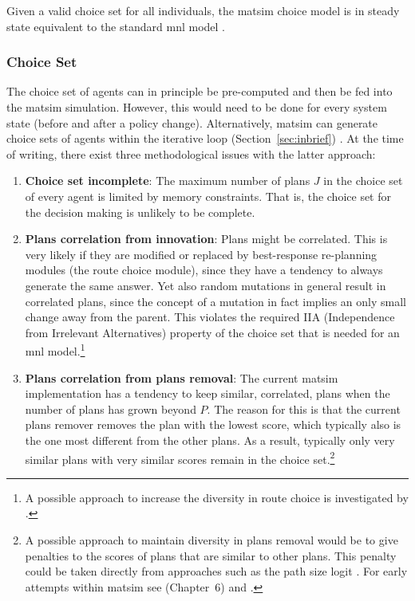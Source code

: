 Given a valid choice set for all individuals, the \acrshort{matsim} choice model is in steady state equivalent to the standard \gls{mnl} model \citep{NagelFloetteroed2009IatbrResourceInBook}.

\subsubsection{Choice Set}
\label{sec:choice-set}


The choice set of agents can in principle be pre-computed and then be fed into the \acrshort{matsim} simulation. However, this would need to be done for every system state (\eg before and after a policy change).
%
Alternatively, \acrshort{matsim} can generate choice sets of agents within the iterative loop (Section~\ref{sec:inbrief})
%
%
. At the time of writing, there exist three methodological issues with the latter approach:
%
\begin{enumerate}\styleEnumerate
\item \textbf{Choice set incomplete}: The maximum number of plans $J$ in the choice set of every agent is limited by memory constraints. That is, the choice set for the decision making is unlikely to be complete.
%
\item \textbf{Plans correlation from innovation}: Plans might be correlated. This is very likely if they are modified or replaced by best-response re-planning modules (\eg the route choice module), since they have a tendency to always generate the same answer. Yet also random mutations in general result in correlated plans, since the concept of a mutation in fact implies an only small change away from the parent.  This violates the required IIA (Independence from Irrelevant Alternatives) 
property of the choice set that is needed for an \gls{mnl} 
model.\footnote{%
%
A possible approach to increase the diversity in route choice is investigated by \citet{NagelKickhoeferJoubert2014HeterogeneousVoTsPROCEDIA}.
%
}

\item \textbf{Plans correlation from plans removal}: The current \acrshort{matsim} implementation has a tendency to keep similar, \ie  correlated, plans when the number of plans has grown beyond $P$.  The reason for this is that the current plans remover removes the plan with the lowest score, which typically also is the one most different from the other plans.  As a result, typically only very similar plans with very similar scores remain in the choice set.\footnote{%
%
A possible approach to maintain diversity in plans removal would be to give penalties to the scores of plans that are similar to other plans.  This penalty could be taken directly from approaches such as the path size logit \citep{DaganzoSheffi1977SUE,FrejingerBierlaire2007PathSizeLogit}.  For early attempts within \acrshort{matsim} see \cite{Grether2014PhD} (Chapter~6) and \cite{NeumannEtAlPassengerArrivalPatterns}.
%
}
%
\end{enumerate}
